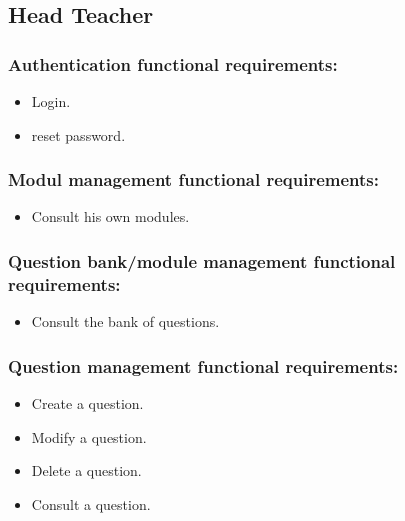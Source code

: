 \documentclass[]{uc2pfecaneva}
\begin{document}
    \subsection{Head Teacher}
    \begin{itemize}
        \subsubsection{Authentication functional requirements:}
        \begin{itemize}
            \item Login.
            \item reset password.
        \end{itemize}

        \subsubsection{Modul management functional requirements:}
        \begin{itemize}
            \item Consult his own modules.
        \end{itemize}

        \subsubsection{Question bank/module management functional requirements:}
        \begin{itemize}
            \item Consult the bank of questions.
        \end{itemize}

        \subsubsection{Question management functional requirements:}
        \begin{itemize}
            \item Create a question.
            \item Modify a question.
            \item Delete a question.
            \item Consult a question.
        \end{itemize}


\end{itemize}
\end{document}
